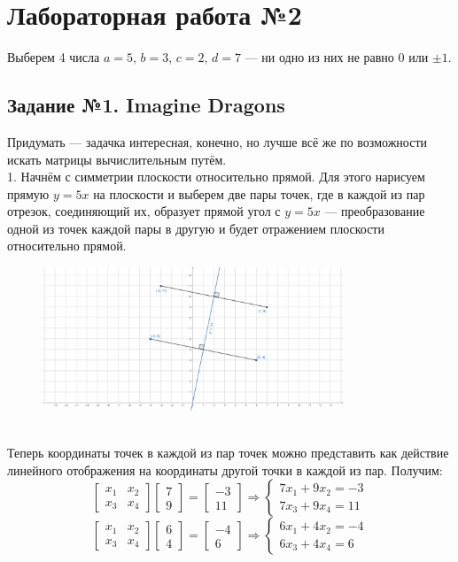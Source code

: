 \documentclass[a3paper,14pt]{extarticle}
\begin{document}
\section*{\centering Лабораторная работа №2}
Выберем 4 числа $a=5$, $b=3$, $c=2$, $d=7$ --- ни одно из них не равно $0$ или $\pm1$.
\subsection*{\centering Задание №1. Imagine Dragons}
Придумать — задачка интересная, конечно, но лучше всё же по возможности искать матрицы вычислительным путём. \\[0.5em]
1. Начнём с симметрии плоскости относительно прямой. Для этого нарисуем прямую $y=5x$ на плоскости и выберем две пары точек, где в каждой из пар отрезок, соединяющий их, образует прямой угол с $y=5x$ --- преобразование одной из точек каждой пары в другую и будет отражением плоскости относительно прямой.
\begin{figure}[h]
    \centering
    \includegraphics[width=0.8\textwidth]{task1.png}
\end{figure} \\
Теперь координаты точек в каждой из пар точек можно представить как действие линейного отображения на координаты другой точки в каждой из пар. Получим:
$$\begin{bmatrix}
        x_1 & x_2 \\ x_3 & x_4
    \end{bmatrix}\begin{bmatrix}
        7 \\ 9
    \end{bmatrix} = \begin{bmatrix}
        -3 \\ 11
    \end{bmatrix} \Rightarrow \begin{cases}
        7x_1+9x_2 = -3 \\ 7x_3+9x_4 = 11
    \end{cases}$$$$\begin{bmatrix}
        x_1 & x_2 \\ x_3 & x_4
    \end{bmatrix}\begin{bmatrix}
        6 \\ 4
    \end{bmatrix} = \begin{bmatrix}
        -4 \\ 6
    \end{bmatrix} \Rightarrow \begin{cases}
        6x_1+4x_2 = -4 \\ 6x_3+4x_4 = 6
    \end{cases}$$
\end{document}
